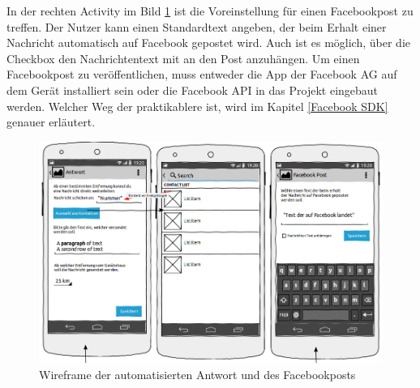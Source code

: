 In der rechten Activity im Bild \ref{Wireframe Antwort} ist die Voreinstellung f\"ur einen Facebookpost zu treffen. Der Nutzer kann einen Standardtext angeben, der beim Erhalt einer Nachricht automatisch auf Facebook gepostet wird. Auch ist es m\"oglich, \"uber die Checkbox den Nachrichtentext mit an den Post anzuh\"angen. Um einen Facebookpost zu ver\"offentlichen, muss entweder die App der Facebook AG auf dem Ger\"at installiert sein oder die Facebook API in das Projekt eingebaut werden. Welcher Weg der praktikablere ist, wird im Kapitel \ref{Facebook SDK} genauer erl\"autert.
\begin{figure}[!ht]
\centering
\includegraphics[width=16cm]{Bilder/WireframeAntwort.png}
\caption{Wireframe der automatisierten Antwort und des Facebookposts}
\label{Wireframe Antwort}
\centering
\end{figure}

